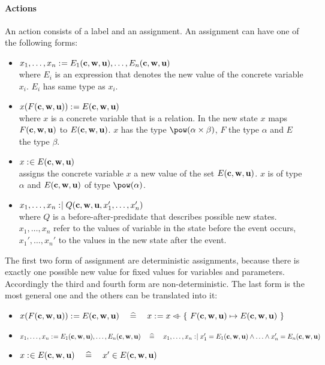 \paragraph{Actions}
An action consists of a label and an assignment.
An assignment can have one of the following forms:
\begin{itemize}
\item $x_1,\ldots,x_n \mathrel{:\mkern1mu=} E_1(\textbf{c},\textbf{w},\textbf{u}),\ldots,E_n(\textbf{c},\textbf{w},\textbf{u})$ \\
  where $E_i$ is an expression that denotes the new value of the concrete variable $x_i$.
  $E_i$ has same type as $x_i$.
\item $x(F(\textbf{c},\textbf{w},\textbf{u})) \mathrel{:\mkern1mu=} E(\textbf{c},\textbf{w},\textbf{u})$ \\
  where $x$ is a concrete variable that is a relation.
  In the new state $x$ maps $F(\textbf{c},\textbf{w},\textbf{u})$ to $E(\textbf{c},\textbf{w},\textbf{u})$.
  $x$ has the type $\pow(\alpha\cprod\beta)$, $F$ the type $\alpha$ and $E$ the
  type $\beta$.
\item $x \mathrel{:\mkern1mu\in} E(\textbf{c},\textbf{w},\textbf{u})$ \\
  assigns the concrete variable $x$ a new value of the set $E(\textbf{c},\textbf{w},\textbf{u})$.
  $x$ is of type
  $\alpha$ and $E(\textbf{c},\textbf{w},\textbf{u})$ of type $\pow(\alpha)$.
\item $x_1,\ldots,x_n \mathrel{:\mkern1mu\mid} Q(\textbf{c},\textbf{w},\textbf{u},x_1',\ldots,x_n')$ \\
  where $Q$ is a before-after-predidate that describes possible new states.
  $x_1,\ldots,x_n$ refer to the values of variable in the state before the event occurs,
  $x_1',\ldots,x_n'$ to the values in the new state after the event.
\end{itemize}
The first two form of assignment are deterministic assignments, because 
  there is exactly one possible new value for fixed values for variables and parameters.
Accordingly the third and fourth form are non-deterministic.
The last form is the most general one and the others can be translated into it:
\begin{itemize}
\item $x(F(\textbf{c},\textbf{w},\textbf{u})) \mathrel{:\mkern1mu=} E(\textbf{c},\textbf{w},\textbf{u})
  \quad\mathrel{\widehat=}\quad 
  x \mathrel{:\mkern1mu=} x \mathbin{\lhd\mkern-9mu-} \{~F(\textbf{c},\textbf{w},\textbf{u}) \mapsto E(\textbf{c},\textbf{w},\textbf{u})~\}$
\item $x_1,\ldots,x_n \mathrel{:\mkern1mu=} E_1(\textbf{c},\textbf{w},\textbf{u}),\ldots,E_n(\textbf{c},\textbf{w},\textbf{u})
  \quad\mathrel{\widehat=}\quad
  x_1,\ldots,x_n \mathrel{:\mkern1mu\mid} x_1' = E_1(\textbf{c},\textbf{w},\textbf{u}) \land \ldots \land x_n' = E_n(\textbf{c},\textbf{w},\textbf{u})$
\item $x \mathrel{:\mkern1mu\in} E(\textbf{c},\textbf{w},\textbf{u}) 
  \quad\mathrel{\widehat=}\quad
  x' \in E(\textbf{c},\textbf{w},\textbf{u})$
\end{itemize}
